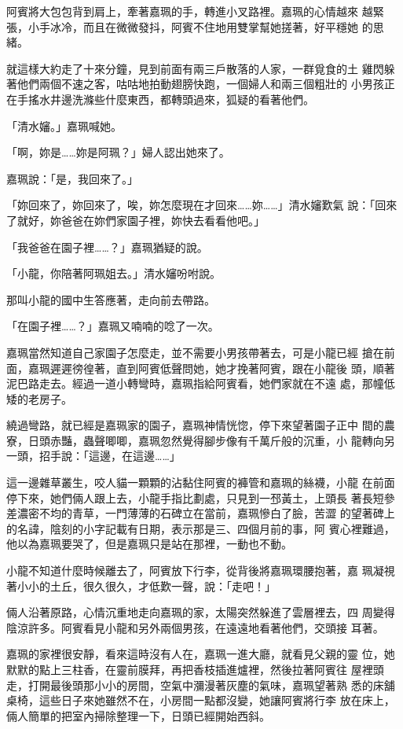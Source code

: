 阿賓將大包包背到肩上，牽著嘉珮的手，轉進小叉路裡。嘉珮的心情越來
越緊張，小手冰冷，而且在微微發抖，阿賓不住地用雙掌幫她搓著，好平穩她
的思緒。

就這樣大約走了十來分鐘，見到前面有兩三戶散落的人家，一群覓食的土
雞閃躲著他們兩個不速之客，咕咕地拍動翅膀快跑，一個婦人和兩三個粗壯的
小男孩正在手搖水井邊洗滌些什麼東西，都轉頭過來，狐疑的看著他們。

「清水嬸。」嘉珮喊她。

「啊，妳是……妳是阿珮？」婦人認出她來了。

嘉珮說：「是，我回來了。」

「妳回來了，妳回來了，唉，妳怎麼現在才回來……妳……」清水嬸歎氣
說：「回來了就好，妳爸爸在妳們家園子裡，妳快去看看他吧。」

「我爸爸在園子裡……？」嘉珮猶疑的說。

「小龍，你陪著阿珮姐去。」清水嬸吩咐說。

那叫小龍的國中生答應著，走向前去帶路。

「在園子裡……？」嘉珮又喃喃的唸了一次。

嘉珮當然知道自己家園子怎麼走，並不需要小男孩帶著去，可是小龍已經
搶在前面，嘉珮遲遲徬徨著，直到阿賓低聲問她，她才挽著阿賓，跟在小龍後
頭，順著泥巴路走去。經過一道小轉彎時，嘉珮指給阿賓看，她們家就在不遠
處，那幢低矮的老房子。

繞過彎路，就已經是嘉珮家的園子，嘉珮神情恍惚，停下來望著園子正中
間的農寮，日頭赤豔，蟲聲唧唧，嘉珮忽然覺得腳步像有千萬斤般的沉重，小
龍轉向另一頭，招手說：「這邊，在這邊……」

這一邊雜草叢生，咬人貓一顆顆的沾黏住阿賓的褲管和嘉珮的絲襪，小龍
在前面停下來，她們倆人跟上去，小龍手指比劃處，只見到一邳黃土，上頭長
著長短參差濃密不均的青草，一門薄薄的石碑立在當前，嘉珮慘白了臉，苦澀
的望著碑上的名諱，陰刻的小字記載有日期，表示那是三、四個月前的事，阿
賓心裡難過，他以為嘉珮要哭了，但是嘉珮只是站在那裡，一動也不動。

小龍不知道什麼時候離去了，阿賓放下行李，從背後將嘉珮環腰抱著，嘉
珮凝視著小小的土丘，很久很久，才低歎一聲，說：「走吧！」

倆人沿著原路，心情沉重地走向嘉珮的家，太陽突然躲進了雲層裡去，四
周變得陰涼許多。阿賓看見小龍和另外兩個男孩，在遠遠地看著他們，交頭接
耳著。

嘉珮的家裡很安靜，看來這時沒有人在，嘉珮一進大廳，就看見父親的靈
位，她默默的點上三柱香，在靈前膜拜，再把香枝插進爐裡，然後拉著阿賓往
屋裡頭走，打開最後頭那小小的房間，空氣中瀰漫著灰塵的氣味，嘉珮望著熟
悉的床舖桌椅，這些日子來她雖然不在，小房間一點都沒變，她讓阿賓將行李
放在床上，倆人簡單的把室內掃除整理一下，日頭已經開始西斜。

